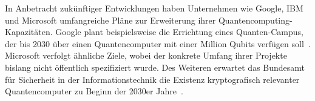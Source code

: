 In Anbetracht zukünftiger Entwicklungen haben Unternehmen wie Google, IBM und Microsoft umfangreiche Pläne zur Erweiterung ihrer Quantencomputing-Kapazitäten. 
Google plant beispielsweise die Errichtung eines Quanten-Campus, der bis 2030 über einen Quantencomputer mit einer Million Qubits verfügen soll~\cite{Google_2023}. 
Microsoft verfolgt ähnliche Ziele, wobei der konkrete Umfang ihrer Projekte bislang nicht öffentlich spezifiziert wurde.
Des Weiteren erwartet das Bundesamt für Sicherheit in der Informationstechnik die Existenz kryptografisch relevanter Quantencomputer zu Beginn der 2030er Jahre~\cite{BSI_KPMG_2023}. 
